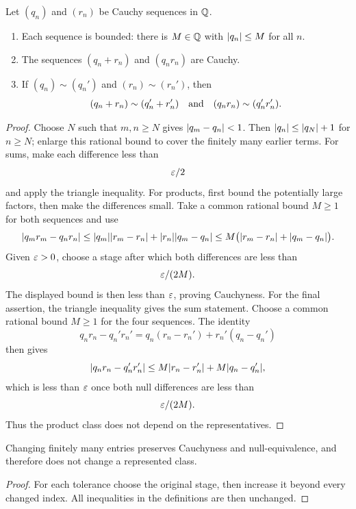\begin{lemma}
\label{lem:cauchy-facts-q}
Let $(q_n)$ and $(r_n)$ be Cauchy sequences in $\mathbb{Q}$.
\begin{enumerate}
\item Each sequence is bounded: there is $M\in\mathbb{Q}$ with $\lvert q_n\rvert\leq M$ for all $n$.
\item The sequences $(q_n+r_n)$ and $(q_nr_n)$ are Cauchy.
\item If $(q_n)\sim(q_n')$ and $(r_n)\sim(r_n')$, then
\[
(q_n+r_n)\sim(q_n'+r_n')
\quad\hbox{and}\quad
(q_nr_n)\sim(q_n'r_n').
\]
\end{enumerate}
\end{lemma}
\begin{proof}
Choose $N$ such that $m,n\geq N$ gives $\lvert q_m-q_n\rvert<1$. Then $\lvert q_n\rvert\leq\lvert q_N\rvert+1$ for $n\geq N$; enlarge this rational bound to cover the finitely many earlier terms. For sums, make each difference less than
\[
\varepsilon/2
\]
 and apply the triangle inequality. For products, first bound the potentially large factors, then make the differences small. Take a common rational bound $M\geq1$ for both sequences and use
\[
\lvert q_mr_m-q_nr_n\rvert\leq\lvert q_m\rvert\lvert r_m-r_n\rvert+\lvert r_n\rvert\lvert q_m-q_n\rvert\leq M\bigl(\lvert r_m-r_n\rvert+\lvert q_m-q_n\rvert\bigr).
\]
Given $\varepsilon>0$, choose a stage after which both differences are less than
\[
\varepsilon/(2M).
\]
 The displayed bound is then less than $\varepsilon$, proving Cauchyness. For the final assertion, the triangle inequality gives the sum statement. Choose a common rational bound $M\geq1$ for the four sequences. The identity
\[
q_nr_n-q_n'r_n' =q_n(r_n-r_n')+r_n'(q_n-q_n')
\]
then gives
\[
\lvert q_nr_n-q_n'r_n'\rvert\leq M\lvert r_n-r_n'\rvert+M\lvert q_n-q_n'\rvert,
\]
which is less than $\varepsilon$ once both null differences are less than
\[
\varepsilon/(2M).
\]
 Thus the product class does not depend on the representatives.
\end{proof}


\begin{lemma}
Changing finitely many entries preserves Cauchyness and null-equivalence,
and therefore does not change a represented class.
\end{lemma}
\begin{proof}
For each tolerance choose the original stage, then increase it beyond every
changed index. All inequalities in the definitions are then unchanged.
\end{proof}

